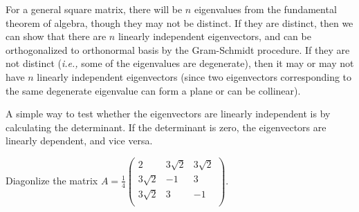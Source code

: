 \documentclass[a4paper,12pt]{report}
\begin{document}
For a general square matrix, there will be \(n\) eigenvalues from the fundamental theorem of algebra, though they may not be distinct. If they are distinct, then we can show that there are \(n\) linearly independent eigenvectors, and can be orthogonalized to orthonormal basis by the Gram-Schmidt procedure. If they are not distinct (\textit{i.e.,} some of the eigenvalues are degenerate), then it may or may not have \(n\) linearly independent eigenvectors (since two eigenvectors corresponding to the same degenerate eigenvalue can form a plane or can be collinear).

A simple way to test whether the eigenvectors are linearly independent is by calculating the determinant. If the determinant is zero, the eigenvectors are linearly dependent, and vice versa.

{Diagonlize the matrix \(A = \frac{1}{4} \begin{pmatrix}
    2 & 3\sqrt{2}  & 3\sqrt{2}   \\
    3\sqrt{2}  & -1 & 3  \\
    3\sqrt{2}  & 3 & -1  \\
\end{pmatrix}\). }
\end{document}
